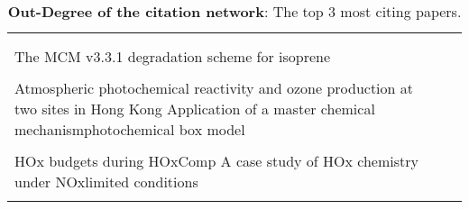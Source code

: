 \begin{table}[H]
    \centering
     \begin{tabular}{p{}r}
     \toprule
      & \\ \\
     The MCM v3.3.1 degradation scheme for isoprene & \cite{isopmcm}  \\ \\
        Atmospheric photochemical reactivity and ozone production at two sites in Hong Kong Application of a master chemical mechanismphotochemical box model & \cite{hongkongmcm}   \\ \\
        HOx budgets during HOxComp A case study of HOx chemistry under NOxlimited conditions & \cite{hoxcompmcm}  \\ \\
        \bottomrule
    \end{tabular}
    \caption{\textbf{Out-Degree of the citation network}: The top 3 most citing papers.}
    \label{tab:Out-Degree_Citation}
    \end{table}

    